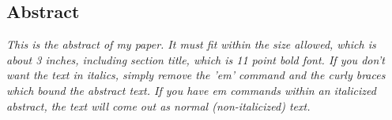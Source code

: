 \thispagestyle{empty}
\subsection*{\centering Abstract}
{\em
This is the abstract of my paper.  It must fit within the 
size allowed, which is about 3 inches, including section 
title, which is 11 point bold font.  If you don't want 
the text in italics, simply remove the 'em' command and 
the curly braces which bound the abstract text.  If you 
have em commands within an italicized abstract, the text 
will come out as normal (non-italicized) text. 
}

